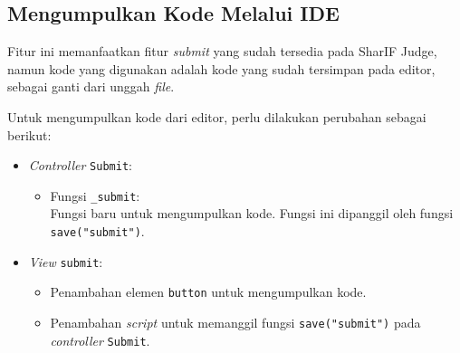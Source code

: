 \subsection{Mengumpulkan Kode Melalui IDE}
\label{subsec:4:kumpul}

Fitur ini memanfaatkan fitur \textit{submit} yang sudah tersedia pada SharIF Judge, namun kode yang digunakan adalah kode yang sudah tersimpan pada editor, sebagai ganti dari unggah \textit{file}. 

Untuk mengumpulkan kode dari editor, perlu dilakukan perubahan sebagai berikut:
\begin{itemize}
	\item \textit{Controller} \verb|Submit|:
    \begin{itemize}
		\item Fungsi \verb|_submit|: \\ Fungsi baru untuk mengumpulkan kode. Fungsi ini dipanggil oleh fungsi \verb|save("submit")|.
    \end{itemize}
    \item \textit{View} \verb|submit|:
    \begin{itemize}
        \item Penambahan elemen \verb|button| untuk mengumpulkan kode.
        \item Penambahan \textit{script} untuk memanggil fungsi \verb|save("submit")| pada \textit{controller} \verb|Submit|. 
    \end{itemize}
\end{itemize}
